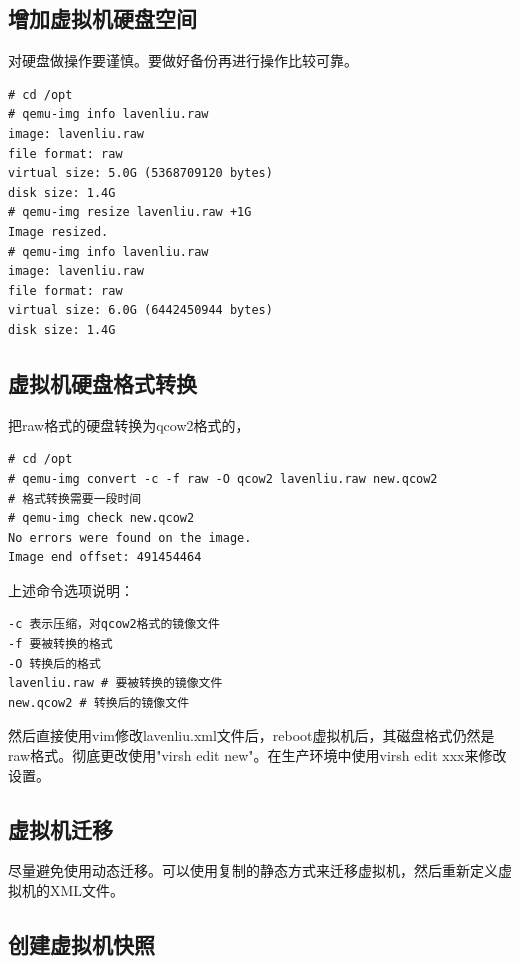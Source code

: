 \subsection{增加虚拟机硬盘空间}
\label{sec:scaleVmDisk}

对硬盘做操作要谨慎。要做好备份再进行操作比较可靠。

\begin{verbatim}
# cd /opt
# qemu-img info lavenliu.raw 
image: lavenliu.raw
file format: raw
virtual size: 5.0G (5368709120 bytes)
disk size: 1.4G
# qemu-img resize lavenliu.raw +1G
Image resized.
# qemu-img info lavenliu.raw 
image: lavenliu.raw
file format: raw
virtual size: 6.0G (6442450944 bytes)
disk size: 1.4G
\end{verbatim}

\subsection{虚拟机硬盘格式转换}
\label{sec:convertVmDisk}

把raw格式的硬盘转换为qcow2格式的，

\begin{verbatim}
# cd /opt
# qemu-img convert -c -f raw -O qcow2 lavenliu.raw new.qcow2
# 格式转换需要一段时间
# qemu-img check new.qcow2
No errors were found on the image.
Image end offset: 491454464
\end{verbatim}

上述命令选项说明：

\begin{verbatim}
-c 表示压缩，对qcow2格式的镜像文件
-f 要被转换的格式
-O 转换后的格式
lavenliu.raw # 要被转换的镜像文件
new.qcow2 # 转换后的镜像文件
\end{verbatim}

然后直接使用vim修改lavenliu.xml文件后，reboot虚拟机后，其磁盘格式仍然是raw格式。彻底更改使用"virsh edit new"。在生产环境中使用virsh edit xxx来修改设置。

\subsection{虚拟机迁移}
\label{sec:moveVM}

尽量避免使用动态迁移。可以使用复制的静态方式来迁移虚拟机，然后重新定义虚拟机的XML文件。

\subsection{创建虚拟机快照}
\label{sec:createSnapShot}

